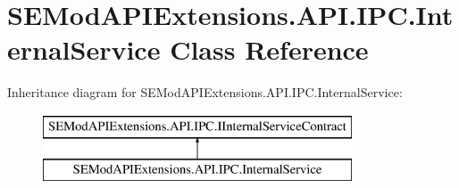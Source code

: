 \hypertarget{class_s_e_mod_a_p_i_extensions_1_1_a_p_i_1_1_i_p_c_1_1_internal_service}{}\section{S\+E\+Mod\+A\+P\+I\+Extensions.\+A\+P\+I.\+I\+P\+C.\+Internal\+Service Class Reference}
\label{class_s_e_mod_a_p_i_extensions_1_1_a_p_i_1_1_i_p_c_1_1_internal_service}
Inheritance diagram for S\+E\+Mod\+A\+P\+I\+Extensions.\+A\+P\+I.\+I\+P\+C.\+Internal\+Service\+:\begin{figure}[H]
\begin{center}
\leavevmode
\includegraphics[height=2.000000cm]{class_s_e_mod_a_p_i_extensions_1_1_a_p_i_1_1_i_p_c_1_1_internal_service}
\end{center}
\end{figure}
